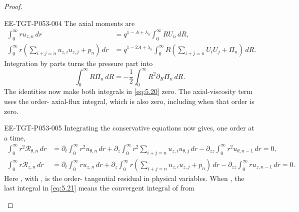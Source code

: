 \begin{proof}
\begin{EESegment}{EE-TGT-P053-004}
The axial moments are
\begin{equation}\label{eq:5.20}
\begin{aligned}
\int_0^\infty ru_{z,n}\,dr
&=q^{1-A+\lambda_n}\int_0^\infty RU_n\,dR,\\
\int_0^\infty r\left(\sum_{i+j=n}u_{z,i}u_{z,j}+p_n\right)\,dr
&=q^{1-2A+\lambda_n}\int_0^\infty R\left(\sum_{i+j=n}U_iU_j+\Pi_n\right)\,dR.
\end{aligned}
\tag{5.20}
\end{equation}
Integration by parts turns the pressure part into
\[
\int_0^\infty R\Pi_n\,dR=-\frac12\int_0^\infty R^2\partial_R\Pi_n\,dR.
\]
The identities  now make both integrals in \eqref{eq:5.20} zero. The
axial-viscosity term uses the order- axial-flux integral, which is also zero, including when that
order is zero.
\end{EESegment}

\begin{EESegment}{EE-TGT-P053-005}
Integrating the conservative equations now gives, one order at a time,
\begin{equation}\label{eq:5.21}
\begin{aligned}
\int_0^\infty r^2\mathscr R_{\theta,n}\,dr
&=\partial_t\int_0^\infty r^2u_{\theta,n}\,dr
 +\partial_z\int_0^\infty r^2\sum_{i+j=n}u_{z,i}u_{\theta,j}\,dr
 -\partial_{zz}\int_0^\infty r^2u_{\theta,n-1}\,dr
 =0,\\
\int_0^\infty r\mathscr R_{z,n}\,dr
&=\partial_t\int_0^\infty ru_{z,n}\,dr
 +\partial_z\int_0^\infty r\left(\sum_{i+j=n}u_{z,i}u_{z,j}+p_n\right)\,dr
 -\partial_{zz}\int_0^\infty ru_{z,n-1}\,dr
 =0.
\end{aligned}
\tag{5.21}
\end{equation}
Here , with
, is the order- tangential residual in physical variables.
When , the last integral in \eqref{eq:5.21} means the convergent integral of
 from
\end{EESegment}


\end{proof}
